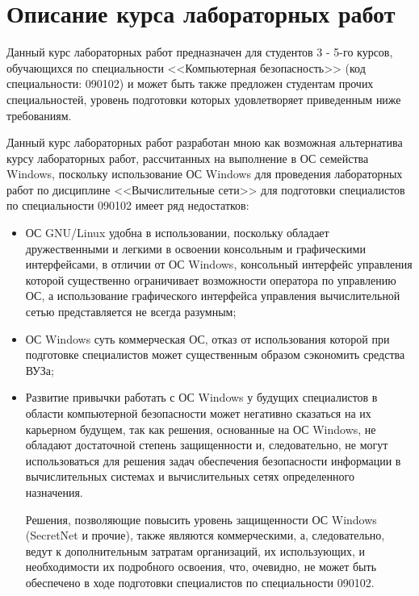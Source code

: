 
\section{Описание курса лабораторных работ}

	Данный курс лабораторных работ предназначен для студентов 3 - 5-го курсов, обучающихся по специальности <<Компьютерная безопасность>>
	(код специальности: 090102) и может быть также предложен студентам прочих специальностей, уровень подготовки которых удовлетворяет приведенным
	ниже требованиям.

	Данный курс лабораторных работ разработан мною как возможная альтернатива курсу лабораторных работ, рассчитанных на выполнение в ОС семейства
	Windows, поскольку использование ОС Windows для проведения лабораторных работ по дисциплине <<Вычислительные сети>>
	для подготовки специалистов по специальности 090102 имеет ряд недостатков:

	\begin{itemize}

		\item ОС GNU/Linux удобна в использовании, поскольку обладает дружественными и легкими в освоении консольным и графическими интерфейсами,
		в отличии от ОС Windows, консольный интерфейс управления которой существенно ограничивает возможности оператора по управлению ОС,
		а использование графического интерфейса управления вычислительной сетью представляется не всегда разумным;

		\item ОС Windows суть коммерческая ОС, отказ от использования которой при подготовке специалистов может существенным образом сэкономить средства
		ВУЗа;

		\item Развитие привычки работать с ОС Windows у будущих специалистов в области компьютерной безопасности может негативно сказаться на их
		карьерном будущем, так как решения, основанные на ОС Windows, не обладают достаточной степень защищенности и, следовательно, не могут использоваться
		для решения задач обеспечения безопасности информации в вычислительных системах и вычислительных сетях определенного назначения.

		Решения, позволяющие повысить уровень защищенности ОС Windows (SecretNet и прочие), также являются коммерческими, а, следовательно, ведут к
		дополнительным затратам организаций, их использующих, и необходимости их подробного освоения, что, очевидно, не может быть обеспечено в ходе подготовки
		специалистов по специальности 090102.

	\end{itemize}

